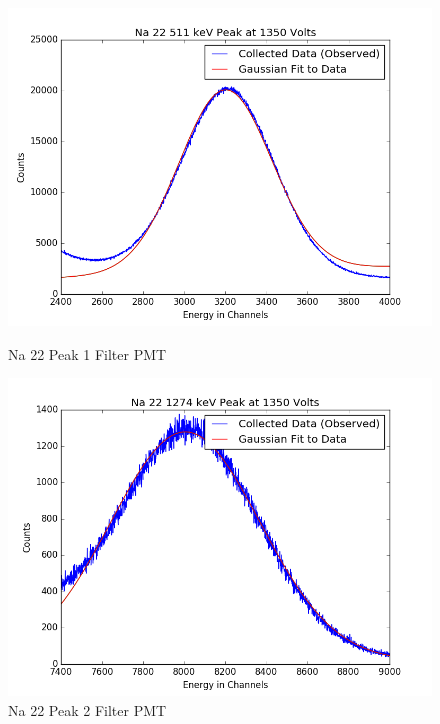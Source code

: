 \documentclass{article}
\begin{document}
\begin{figure}[H]
  \centering
  \begin{minipage}[b]{0.4\textwidth}
    \includegraphics[width=\textwidth]{FilNa1fit.png}
    \caption{Na 22 Peak 1 Filter PMT}
  \end{minipage}
  \hfill
  \begin{minipage}[b]{0.4\textwidth}
    \includegraphics[width=\textwidth]{FilNa2fit.png}
    \caption{Na 22 Peak 2 Filter PMT}
  \end{minipage}
\end{figure}
\end{document}
